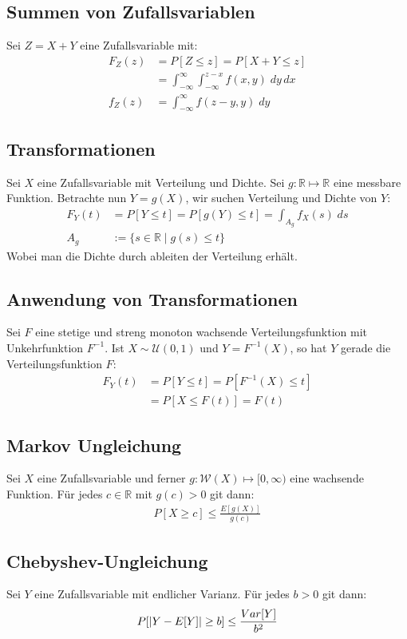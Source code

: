 \documentclass[8pt]{extarticle}
\newcommand{\R}{\mathbb{R}}
\newcommand{\W}{\mathcal{W}}
\begin{document}
\begin{multicols*}{3}
  \subsection*{Summen von Zufallsvariablen}
  Sei $Z = X + Y$ eine Zufallsvariable mit:
  \begin{align*}
    F_Z(z) & = P[Z \leq z] = P[X + Y \leq z]                                    \\
           & = \int_{-\infty}^\infty \int_{-\infty}^{z - x} f(x, y )\; dy \, dx \\
    f_Z(z) & = \int_{-\infty}^\infty f(z - y, y) \; dy
  \end{align*}
  \subsection*{Transformationen}
  Sei $X$ eine Zufallsvariable mit Verteilung und Dichte. Sei $g: \R \mapsto \R$
  eine messbare Funktion. Betrachte nun $Y = g(X)$, wir
  suchen Verteilung und Dichte von $Y$:
  \begin{align*}
    F_Y(t) & = P[Y \leq t] = P[g(Y) \leq t] = \int_{A_g} f_X(s) \; ds \\
    A_g    & := \{s \in \R \; | \; g(s) \leq t\}
  \end{align*}
  Wobei man die Dichte durch ableiten der Verteilung erhält.
  \subsection*{Anwendung von Transformationen}
  Sei $F$ eine stetige und streng monoton wachsende Verteilungsfunktion
  mit Unkehrfunktion $F^{-1}$. Ist $X \sim \mathcal{U}(0, 1)$ und
  $Y = F^{-1}(X)$, so hat $Y$ gerade die Verteilungsfunktion $F$:
  \begin{align*}
    F_Y(t) & = P[Y \leq t] = P[F^{-1}(X) \leq t] \\
           & = P[X \leq F(t)] = F(t)
  \end{align*}
  \subsection*{Markov Ungleichung}
  Sei $X$ eine Zufallsvariable und ferner $g : \W(X) \mapsto [0, \infty)$ eine
  wachsende Funktion. Für jedes $c \in \R$ mit $g(c) > 0$ git dann:
  \begin{align*}
    P[X \geq c] \leq \frac{E[g(X)]}{g(c)}
  \end{align*}
  \subsection*{Chebyshev-Ungleichung}
  Sei $Y$ eine Zufallsvariable mit endlicher Varianz. Für jedes $b > 0$
  git dann:
  \begin{align*}
    P[\abs{Y - E[Y]} \geq b] \leq \frac{Var[Y]}{b^2}
  \end{align*}

\end{multicols*}
\end{document}

